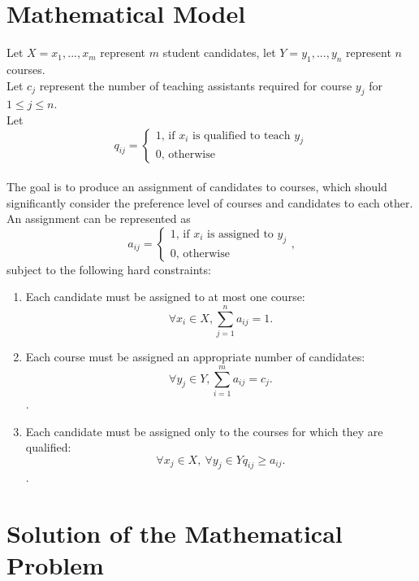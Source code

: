 \documentclass[twoside,twocolumn]{article}
\begin{document}
    \section{Mathematical Model}
    Let $X = {x_1,...,x_m}$ represent $m$ student candidates, let $Y = {y_1,...,y_n}$ represent $n$ courses. \\
    Let $c_j$ represent the number of teaching assistants required for course $y_j$ for $1 \leq j \leq n$. \\
    Let $$q_{ij} = \begin{cases}1\text{, if $x_i$ is qualified to teach $y_j$} \\ 0\text{, otherwise} \end{cases}$$ \\
    The goal is to produce an assignment of candidates to courses, which should significantly consider the preference level of courses and candidates
    to each other. An assignment can be represented as 
    $$a_{ij} = \begin{cases}1\text{, if $x_i$ is assigned to $y_j$} \\ 0\text{, otherwise} \end{cases}\text{,}$$ 
    subject to the following hard constraints:
    \begin{enumerate}
        \item Each candidate must be assigned to at most one course: $$\forall x_i \in X, \sum_{j = 1}^n a_{ij} = 1\text{.}$$
        \item Each course must be assigned an appropriate number of candidates: $$\forall y_j \in Y, \sum_{i = 1}^m a_{ij} = c_j\text{.}$$.
        \item Each candidate must be assigned only to the courses for which they are qualified: $$\forall x_j \in X,\ \forall y_j \in Y q_{ij} \geq a_{ij}\text{.}$$.
    \end{enumerate}
    \section{Solution of the Mathematical Problem}
\end{document}
